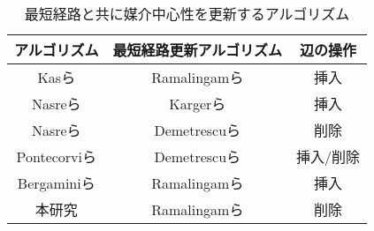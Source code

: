 \begin{table}[tb]
  \label{tab:comparizon-of-algorithms}
  \centering
  \caption{最短経路と共に媒介中心性を更新するアルゴリズム}
  \begin{tabular}{ccc}
    \hline
    アルゴリズム & 最短経路更新アルゴリズム & 辺の操作 \\ \hline
    Kasら\cite{Kas2013} & Ramalingamら\cite{Ramalingam1996} & 挿入 \\ \hline
    Nasreら\cite{Nasre2014a} & Kargerら\cite{Karger1993} & 挿入 \\ \hline
    Nasreら\cite{Nasre2014b} & Demetrescuら\cite{Demetrescu2003} & 削除 \\ \hline
    Pontecorviら\cite{Pontecorvi2015} & Demetrescuら\cite{Demetrescu2003} & 挿入/削除 \\ \hline
    Bergaminiら\cite{Bergamini2017} & Ramalingamら\cite{Ramalingam1996} & 挿入 \\ \hline
    本研究 & Ramalingamら\cite{Ramalingam1996} & 削除 \\ \hline
  \end{tabular}
\end{table}
